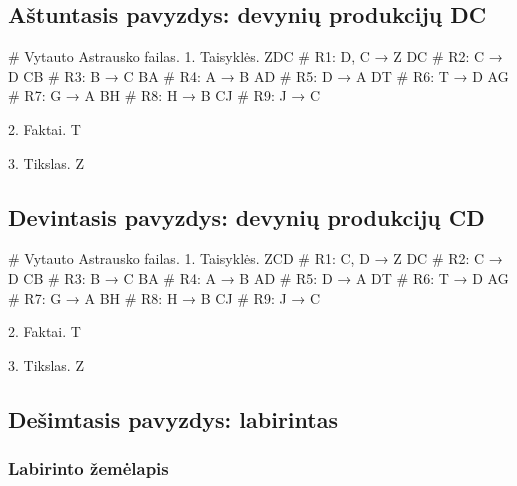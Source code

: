 \subsection{Aštuntasis pavyzdys: devynių produkcijų DC}

\begin{pythonaienv}[bc]
# Vytauto Astrausko failas.
1. Taisyklės.
ZDC                                     # R1: D, C → Z
DC                                      # R2: C → D
CB                                      # R3: B → C
BA                                      # R4: A → B
AD                                      # R5: D → A
DT                                      # R6: T → D
AG                                      # R7: G → A
BH                                      # R8: H → B
CJ                                      # R9: J → C

2. Faktai.
T

3. Tikslas.
Z
\end{pythonaienv}

\subsection{Devintasis pavyzdys: devynių produkcijų CD}

\begin{pythonaienv}[bc]
# Vytauto Astrausko failas.
1. Taisyklės.
ZCD                                     # R1: C, D → Z
DC                                      # R2: C → D
CB                                      # R3: B → C
BA                                      # R4: A → B
AD                                      # R5: D → A
DT                                      # R6: T → D
AG                                      # R7: G → A
BH                                      # R8: H → B
CJ                                      # R9: J → C

2. Faktai.
T

3. Tikslas.
Z
\end{pythonaienv}

\subsection{Dešimtasis pavyzdys: labirintas}

\subsubsection{Labirinto žemėlapis}


